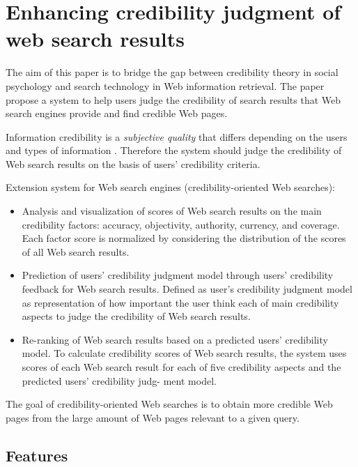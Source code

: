 \documentclass{article}
\begin{document}
\section{Enhancing credibility judgment of web search results \cite{conf/chi/YamamotoT11}}

The aim of this paper is to bridge the gap between credibility theory in social psychology and search technology in Web information retrieval. The paper propose a system to help users judge the credibility of search results that Web search engines provide and find credible Web pages.

Information credibility is a \textit{subjective quality} that differs depending on the users and types of information . Therefore the system should judge the credibility of Web search results on the basis of users' credibility criteria.

Extension system for Web search engines (credibility-oriented Web searches):
\begin{itemize}
\item Analysis and visualization of scores of Web search results on the main credibility factors: accuracy, objectivity, authority, currency, and coverage. Each factor score is normalized by considering the distribution of the scores of all Web search results.

\item Prediction of users’ credibility judgment model through users’ credibility feedback for Web search results. Defined as user’s credibility judgment model as representation of how
important the user think each of main credibility aspects to judge the credibility of Web search results.

\item Re-ranking of Web search results based on a predicted users’ credibility model. To calculate credibility scores of Web search results, the system uses scores of each Web search result for each of five credibility aspects and the predicted users’ credibility judg-
ment model.

\end{itemize}

The goal of credibility-oriented Web searches is to obtain more credible Web pages from the large amount of Web  pages relevant to a given query.

\subsection{Features}
\end{document}
